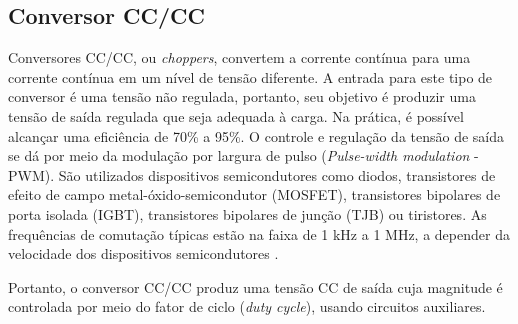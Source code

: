     
    
    
    
    

\subsection{Conversor CC/CC}

Conversores CC/CC, ou \textit{choppers}, convertem a corrente contínua para uma corrente contínua em um nível de tensão diferente. A entrada para este tipo de conversor é uma tensão não regulada, portanto, seu objetivo é produzir uma tensão de saída regulada que seja adequada à carga. Na prática, é possível alcançar uma eficiência de 70\% a 95\%. O controle e regulação da tensão de saída se dá por meio da modulação por largura de pulso (\textit{Pulse-width modulation} - PWM). São utilizados dispositivos semicondutores como diodos, transistores de efeito de campo metal-óxido-semicondutor (MOSFET), transistores bipolares de porta isolada (IGBT), transistores bipolares de junção (TJB) ou tiristores. As frequências de comutação típicas estão na faixa de 1 kHz a 1 MHz, a depender da velocidade dos dispositivos semicondutores \cite{forward}.

Portanto, o conversor CC/CC produz uma tensão CC de saída cuja magnitude é controlada por meio do fator de ciclo (\textit{duty cycle}), usando circuitos auxiliares. 


